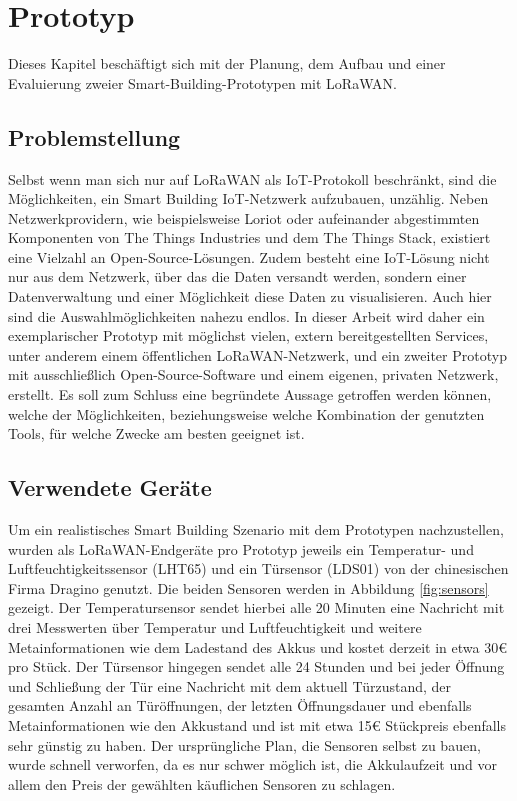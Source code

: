 \chapter{Prototyp}
\label{sec:Prot:first}

Dieses Kapitel beschäftigt sich mit der Planung, dem Aufbau und einer Evaluierung zweier Smart-Building-Prototypen mit LoRaWAN. 

\section{Problemstellung}
\label{sec:Prot:problem}

Selbst wenn man sich nur auf LoRaWAN als IoT-Protokoll beschränkt, sind die Möglichkeiten, ein Smart Building IoT-Netzwerk aufzubauen, unzählig. Neben Netzwerkprovidern, wie beispielsweise Loriot oder aufeinander abgestimmten Komponenten von The Things Industries und dem The Things Stack, existiert eine Vielzahl an Open-Source-Lösungen. Zudem besteht eine IoT-Lösung nicht nur aus dem Netzwerk, über das die Daten versandt werden, sondern einer Datenverwaltung und einer Möglichkeit diese Daten zu visualisieren. Auch hier sind die Auswahlmöglichkeiten nahezu endlos. In dieser Arbeit wird daher ein exemplarischer Prototyp mit möglichst vielen, extern bereitgestellten Services, unter anderem einem öffentlichen LoRaWAN-Netzwerk, und ein zweiter Prototyp mit ausschließlich Open-Source-Software und einem eigenen, privaten Netzwerk, erstellt. Es soll zum Schluss eine begründete Aussage getroffen werden können, welche der Möglichkeiten, beziehungsweise welche Kombination der genutzten Tools, für welche Zwecke am besten geeignet ist.

\section{Verwendete Geräte}
\label{sec:Prot:hardware}

Um ein realistisches Smart Building Szenario mit dem Prototypen nachzustellen, wurden als LoRaWAN-Endgeräte pro Prototyp jeweils ein Temperatur- und Luftfeuchtigkeitssensor (LHT65) und ein Türsensor (LDS01) von der chinesischen Firma Dragino genutzt. Die beiden Sensoren werden in Abbildung \ref{fig:sensors} gezeigt. Der Temperatursensor sendet hierbei alle 20 Minuten eine Nachricht mit drei Messwerten über Temperatur und Luftfeuchtigkeit und weitere Metainformationen wie dem Lade\-stand des Akkus und kostet derzeit in etwa 30€ pro Stück. Der Türsensor hingegen sendet alle 24 Stunden und bei jeder Öffnung und Schließung der Tür eine Nachricht mit dem aktuell Türzustand, der gesamten Anzahl an Türöffnungen, der letzten Öffnungsdauer und ebenfalls Metainformationen wie den Akkustand und ist mit etwa 15€ Stückpreis ebenfalls sehr günstig zu haben. Der ursprüngliche Plan, die Sensoren selbst zu bauen, wurde schnell verworfen, da es nur schwer möglich ist, die Akkulaufzeit und vor allem den Preis der gewählten käuflichen Sensoren zu schlagen.

